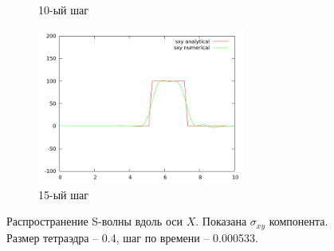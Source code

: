 \begin{figure}[H]
\begin{subfigure}[b]{0.5\textwidth}
\caption{10-ый шаг}
\end{subfigure}
\begin{subfigure}[b]{0.5\textwidth}
\centering
\includegraphics[width=0.75\textwidth]{png/veryfication/0.4/s-wave-along-x15.png}
\caption{15-ый шаг}
\end{subfigure}
\caption{Распространение S-волны вдоль оси $X$. Показана $\sigma_{xy}$ компонента. Размер тетраэдра -- 0.4, шаг по времени -- 0.000533. }
\label{pic:s_wave_along_x4}
\end{figure}

